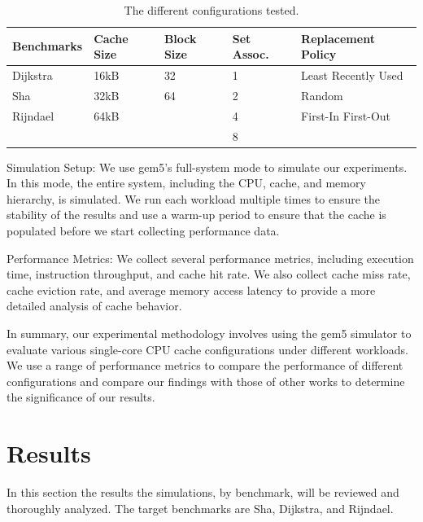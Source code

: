 \documentclass[conference]{IEEEtran}
\begin{document}
\begin{table}[H]
  \centering
  \begin{tabular}{| m{1.6cm} | m{.75cm} | m{.75cm} | m{.8cm} | m{2.6cm} |}
      \hline
      \textbf{Benchmarks} & \textbf{Cache Size} & \textbf{Block Size}& \textbf{Set Assoc.}& \textbf{Replacement Policy} \\ \hline
      Dijkstra    &   16kB  &   32    &  1   &    Least Recently Used     \\ \hline
      Sha         &   32kB  &   64    &  2   &    Random                  \\ \hline
      Rijndael    &   64kB  &         &  4   &    First-In First-Out      \\ \hline
                  &         &         &  8   &                            \\ \hline 
  \end{tabular}
  \vspace{2mm}
  \caption{The different configurations tested.}
  \label{table:configurations}
\end{table}

Simulation Setup:
We use gem5's full-system mode to simulate our experiments. In this mode, the entire system, including the CPU, cache, and memory hierarchy, is simulated. We run each workload multiple times to ensure the stability of the results and use a warm-up period to ensure that the cache is populated before we start collecting performance data.

Performance Metrics:
We collect several performance metrics, including execution time, instruction throughput, and cache hit rate. We also collect cache miss rate, cache eviction rate, and average memory access latency to provide a more detailed analysis of cache behavior.

In summary, our experimental methodology involves using the gem5 simulator to evaluate various single-core CPU cache configurations under different workloads. We use a range of performance metrics to compare the performance of different configurations and compare our findings with those of other works to determine the significance of our results.

\section{Results}
In this section the results the simulations, by benchmark, will be reviewed and thoroughly analyzed. The target benchmarks are Sha, Dijkstra, and Rijndael.
\end{document}
